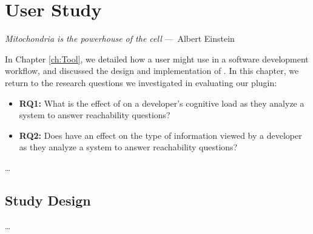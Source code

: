 
\chapter{User Study}
\label{ch:UserStudy}

\begin{epigraph}
    \emph{
       Mitochondria is the powerhouse of the cell
      } ---~Albert Einstein
\end{epigraph}

\noindent In Chapter \ref{ch:Tool}, we detailed how a user might use
\toolname{} in a software development workflow, and discussed the design and 
implementation of \toolname{}.
In this chapter, we return to the research questions we investigated in
evaluating our plugin:

\begin{itemize}
  \item[] \textbf{RQ1:} What is the effect of \toolname{} on a developer's 
  cognitive load as they analyze a system to answer reachability questions?
  \item[] \textbf{RQ2:} Does \toolname{} have an effect on the type of 
  information viewed by a developer as they analyze a system to answer
  reachability questions?
\end{itemize}

\dots

\section{Study Design}
\label{sec:StudyDesign}

\dots

\endinput
